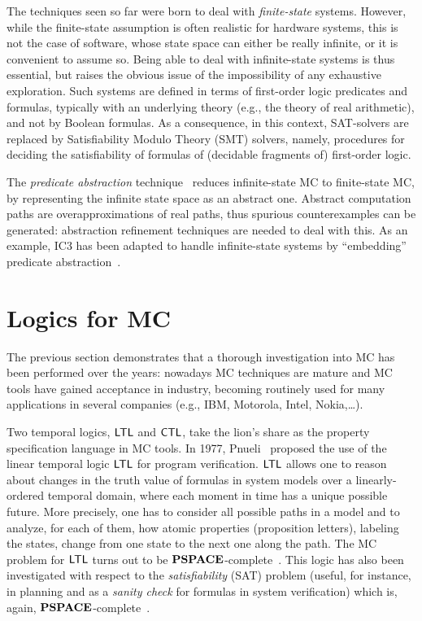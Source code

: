 The techniques seen so far were born to deal with
\emph{finite-state} systems. However, while 
the finite-state assumption is often realistic for
hardware systems,
this is not the case of software, whose state space can either be really infinite, or it is convenient to assume so. 
Being able to deal with infinite-state systems is thus essential, but raises the obvious issue
of the impossibility of any exhaustive exploration.
Such systems are defined in terms of first-order logic predicates and formulas, typically with an underlying theory 
(e.g., the theory of real arithmetic), and not by Boolean formulas. As a consequence, in this context,
SAT-solvers are replaced by Satisfiability Modulo Theory
(SMT) solvers, namely, procedures for deciding the satisfiability of formulas of (decidable fragments of) first-order logic.

The \emph{predicate abstraction} technique~\cite{daniel_et_al}
reduces infinite-state MC to finite-state MC, by representing the infinite state space as an
abstract one.
Abstract computation paths are overapproximations of real paths, thus
spurious counterexamples can be generated: 
abstraction refinement techniques are needed to deal with this.
As an example, IC3 has been adapted to handle infinite-state systems by ``embedding'' predicate abstraction~\cite{Cimatti2012,Cimatti2014,Cimatti2016}.


\section{Logics for MC}
The previous section demonstrates that a thorough investigation into MC has been performed over the years:
nowadays
MC techniques are mature and
MC tools have gained acceptance in industry, becoming routinely used for many applications in several companies (e.g., IBM, Motorola, Intel, Nokia,\dots).

Two temporal logics, $\text{\sffamily LTL}$ and $\text{\sffamily CTL}$, take the lion's share as the property specification language in MC tools.
In 1977, Pnueli~\cite{Pnu77} proposed the use of the linear temporal logic $\text{\sffamily LTL}$ for program verification.
$\text{\sffamily LTL}$ allows one to reason about changes in the truth value of formulas in system models over a linearly-ordered temporal domain, where each moment in time has a unique possible future.
More precisely, one has to consider all possible paths in a model and to analyze, for each of them, how atomic properties (proposition letters), labeling the states, change from one state to the next one along the path.
%
The MC problem for $\text{\sffamily LTL}$ turns out to be $\textbf{PSPACE}$-complete~\cite{CGP02,Sistla:1985}. This logic has also been investigated with respect to the \emph{satisfiability} (SAT) problem (useful, for instance, in planning and as a \emph{sanity check} for formulas in system verification) which is, again, $\textbf{PSPACE}$-complete~\cite{Sistla:1985}.

